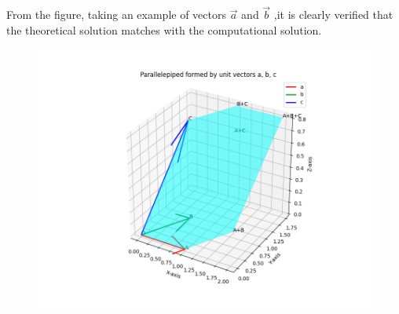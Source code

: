 \documentclass[journal]{IEEEtran}
\begin{document}
From the figure, taking an example of vectors $\vec{a}$ and $\vec{b}$ ,it is clearly verified that the theoretical solution matches with the computational solution.
\newpage
\vspace*{0.25cm}
\begin{figure}[H]
    \centering
    \includegraphics[width=1.0\columnwidth]{figs/Figure-1.png}
    \label{fig:1}
\end{figure}
\end{document}
